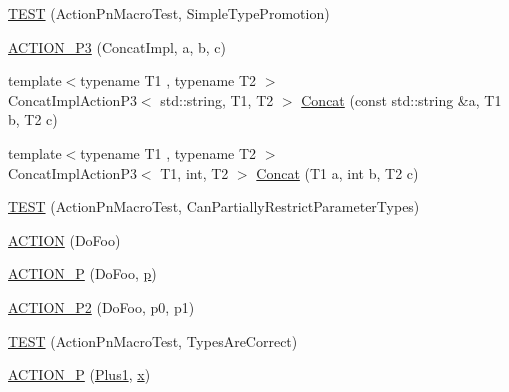 \begin{DoxyCompactItemize}
\item 
\mbox{\hyperlink{namespacetesting_1_1gmock__generated__actions__test_ad42236ad6c6d01fad6dd947ca6163d59}{T\+E\+ST}} (Action\+Pn\+Macro\+Test, Simple\+Type\+Promotion)
\item 
\mbox{\hyperlink{namespacetesting_1_1gmock__generated__actions__test_ae46434959151b83249e52d4869e28cf0}{A\+C\+T\+I\+O\+N\+\_\+\+P3}} (Concat\+Impl, a, b, c)
\item 
{\footnotesize template$<$typename T1 , typename T2 $>$ }\\Concat\+Impl\+Action\+P3$<$ std\+::string, T1, T2 $>$ \mbox{\hyperlink{namespacetesting_1_1gmock__generated__actions__test_aad9da9ba94e4ba373284d13305eda7e5}{Concat}} (const std\+::string \&a, T1 b, T2 c)
\item 
{\footnotesize template$<$typename T1 , typename T2 $>$ }\\Concat\+Impl\+Action\+P3$<$ T1, int, T2 $>$ \mbox{\hyperlink{namespacetesting_1_1gmock__generated__actions__test_ab7e41148b644bc80a67a90d584691978}{Concat}} (T1 a, int b, T2 c)
\item 
\mbox{\hyperlink{namespacetesting_1_1gmock__generated__actions__test_a7222610b197216e7976b3fa751f97daf}{T\+E\+ST}} (Action\+Pn\+Macro\+Test, Can\+Partially\+Restrict\+Parameter\+Types)
\item 
\mbox{\hyperlink{namespacetesting_1_1gmock__generated__actions__test_a183b3863b3c2319ac414fe694455f58c}{A\+C\+T\+I\+ON}} (Do\+Foo)
\item 
\mbox{\hyperlink{namespacetesting_1_1gmock__generated__actions__test_a8487a3396f4f705e134e44584634ef1c}{A\+C\+T\+I\+O\+N\+\_\+P}} (Do\+Foo, \mbox{\hyperlink{_obj__test_2lib_2googletest-master_2googlemock_2test_2gmock-matchers__test_8cc_a6bc6b007533335efe02bafff799ec64c}{p}})
\item 
\mbox{\hyperlink{namespacetesting_1_1gmock__generated__actions__test_acd38e742235e154ad309f22e9a470a86}{A\+C\+T\+I\+O\+N\+\_\+\+P2}} (Do\+Foo, p0, p1)
\item 
\mbox{\hyperlink{namespacetesting_1_1gmock__generated__actions__test_ad702feced8b71b3708782b1a2274453e}{T\+E\+ST}} (Action\+Pn\+Macro\+Test, Types\+Are\+Correct)
\item 
\mbox{\hyperlink{namespacetesting_1_1gmock__generated__actions__test_a89c01b82e854ad79e3d139aa72477747}{A\+C\+T\+I\+O\+N\+\_\+P}} (\mbox{\hyperlink{namespacetesting_1_1gmock__generated__actions__test_a75e901c6d28c591c53a54320a294da55}{Plus1}}, \mbox{\hyperlink{_obj__test_2lib_2googletest-master_2googlemock_2test_2gmock-matchers__test_8cc_a6150e0515f7202e2fb518f7206ed97dc}{x}})

\end{DoxyCompactItemize}
